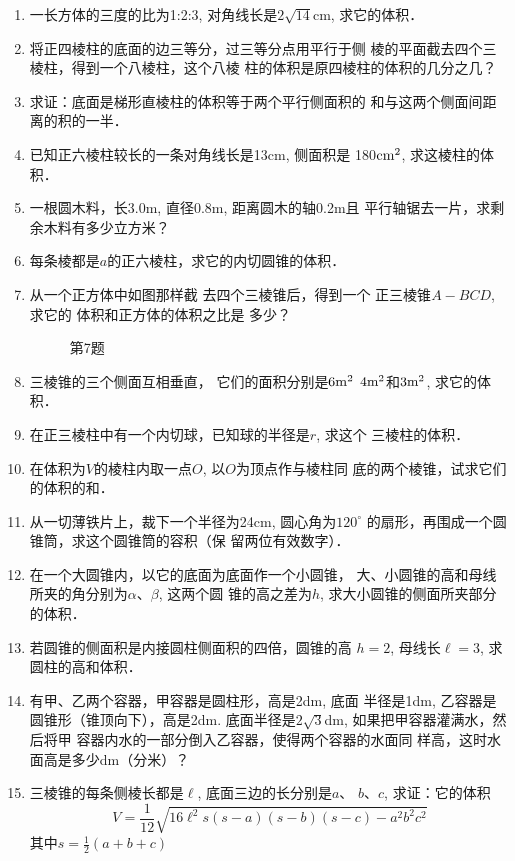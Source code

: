 
\begin{enumerate}
    \item 一长方体的三度的比为1:2:3, 对角线长是$2\sqrt{14}$cm, 求它的体积．
    \item 将正四棱柱的底面的边三等分，过三等分点用平行于侧
    棱的平面截去四个三棱柱，得到一个八棱柱，这个八棱
    柱的体积是原四棱柱的体积的几分之几？
    \item 求证：底面是梯形直棱柱的体积等于两个平行侧面积的
    和与这两个侧面间距离的积的一半．
    \item 已知正六棱柱较长的一条对角线长是13cm, 侧面积是
    180${\rm cm^2}$, 求这棱柱的体积．
    \item 一根圆木料，长3.0m, 直径0.8m, 距离圆木的轴0.2m且
    平行轴锯去一片，求剩余木料有多少立方米？
    \item 每条棱都是$a$的正六棱柱，求它的内切圆锥的体积．
    \item 从一个正方体中如图那样截
    去四个三棱锥后，得到一个
    正三棱锥$A-BCD$, 求它的
    体积和正方体的体积之比是
    多少？

\begin{figure}[htp]
    \centering
    \caption*{第7题}
\end{figure}

    \item 三棱锥的三个侧面互相垂直，
    它们的面积分别是$6{\rm m^2}$
    $4{\rm m^2}$和$3{\rm m^2}$, 求它的体积．
    \item 在正三棱柱中有一个内切球，已知球的半径是$r$, 求这个
    三棱柱的体积．
    \item 在体积为$V$的棱柱内取一点$O$, 以$O$为顶点作与棱柱同
    底的两个棱锥，试求它们的体积的和．
    \item 从一切薄铁片上，裁下一个半径为24cm, 圆心角为$120^{\circ}$
    的扇形，再围成一个圆锥筒，求这个圆锥筒的容积（保
    留两位有效数字）．
    \item 在一个大圆锥内，以它的底面为底面作一个小圆锥，
    大、小圆锥的高和母线所夹的角分别为$\alpha$、$\beta$, 这两个圆
    锥的高之差为$h$, 求大小圆锥的侧面所夹部分的体积．
    \item 若圆锥的侧面积是内接圆柱侧面积的四倍，圆锥的高
    $h=2$, 母线长$\ell =3$, 求圆柱的高和体积．
    \item 有甲、乙两个容器，甲容器是圆柱形，高是2dm, 底面
    半径是1dm, 乙容器是圆锥形（锥顶向下），高是2dm.
    底面半径是$2\sqrt{3}$dm, 如果把甲容器灌满水，然后将甲
    容器内水的一部分倒入乙容器，使得两个容器的水面同
    样高，这时水面高是多少dm（分米）？
\item 三棱锥的每条侧棱长都是$\ell$, 底面三边的长分别是$a$、
$b$、$c$, 求证：它的体积
\[V=\frac{1}{12}\sqrt{16\ell^2 s(s-a)(s-b)(s-c)-a^2b^2c^2}\]
其中$s=\frac{1}{2}(a+b+c)$


\end{enumerate}
